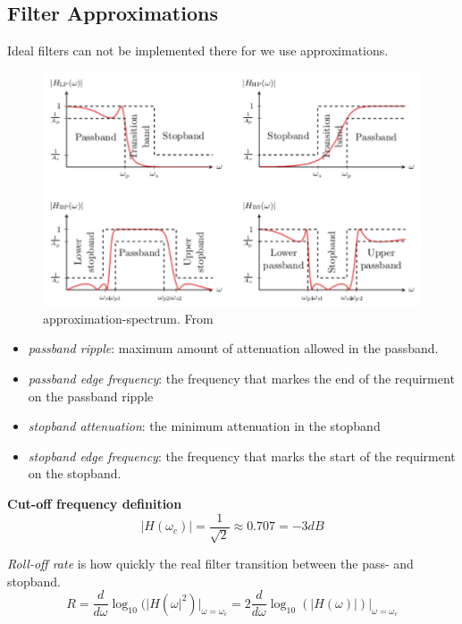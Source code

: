 
\subsection{Filter Approximations}
Ideal filters can not be implemented there for we use approximations. 

\begin{figure}[!ht]
    \centering
    \includegraphics[width=12cm]{image/approximation-spectrum.pdf}
    \caption{approximation-spectrum. From \cite{}}
    \label{fig:approximation-spectrum}
\end{figure}

\begin{itemize}
    \item \textit{passband ripple}: maximum amount of attenuation allowed in the passband.
    \item \textit{passband edge frequency}: the frequency that markes the end of the requirment on the passband ripple
    \item \textit{stopband attenuation}: the minimum attenuation in the stopband
    \item \textit{stopband edge frequency}: the frequency  that marks the start of the requirment on the stopband.
\end{itemize}

\textbf{Cut-off frequency definition}
\begin{equation*}
   |H(\omega_c)| = \frac{1}{\sqrt{2}} \approx 0.707 = -3dB
\end{equation*}


\textit{Roll-off rate} is how quickly the real filter transition between the pass- and stopband.
\begin{equation*}
    R=\frac{d}{d\omega}\log_10(|H(\omega|^2)\Big|_{\omega=\omega_c} = 2\frac{d}{d\omega}\log_10(|H(\omega)|)\Big|_{\omega=\omega_c}
\end{equation*}

